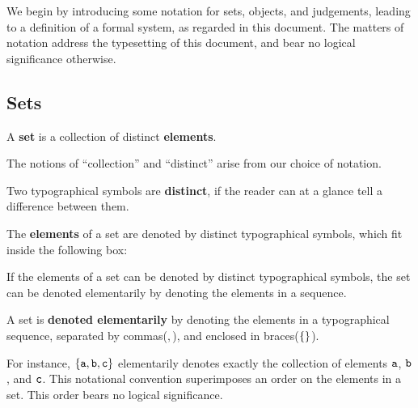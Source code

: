 We begin by introducing some notation for sets, objects, and judgements,
leading to a definition of a formal system, as regarded in this document. The
matters of notation address the typesetting of this document, and bear no
logical significance otherwise.

\subsection{Sets}

\begin{definition}

A \textbf{set} is a collection of distinct \textbf{elements}.

\end{definition}

The notions of ``collection'' and ``distinct'' arise from our choice of
notation.

\begin{notation}

Two typographical symbols are \textbf{distinct}, if the reader can at a glance
tell a difference between them.

\end{notation}

\begin{notation}

The \textbf{elements} of a set are denoted by distinct typographical symbols,
which fit inside the following box:

\begin{center}
\end{center}

\end{notation}

If the elements of a set can be denoted by distinct typographical symbols, the
set can be denoted elementarily by denoting the elements in a sequence. 

\begin{notation}

A set is \textbf{denoted elementarily} by denoting the elements in a
typographical sequence, separated by commas($,$), and enclosed in
braces($\left\{{}\right\}$).

\end{notation}

For instance, $\left\{{\mathtt{a},\mathtt{b},\mathtt{c}}\right\}$ elementarily denotes exactly
the collection of elements $\mathtt{a}$, $\mathtt{b}$, and $\mathtt{c}$.  This
notational convention superimposes an order on the elements in a set. This
order bears no logical significance.

